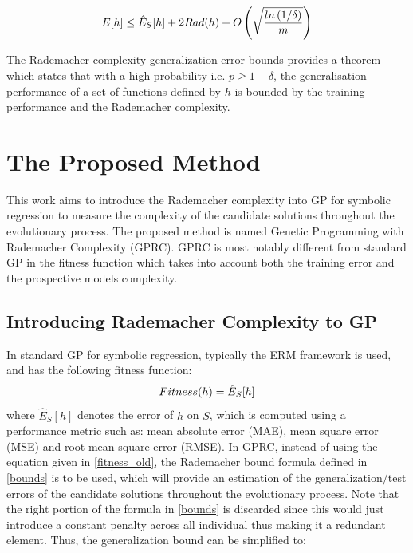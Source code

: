 \documentclass[conference]{IEEEtran}
\begin{document}
\begin{equation}\label{bounds}
\footnotesize
 E[h]\leq\hat{E}_{S}[h] + 2Rad(h) + O\left(\sqrt{\frac{ln\left(1/\delta\right)}{m}}\right)
\end{equation}

The Rademacher complexity generalization error bounds provides a theorem which states that with a high probability i.e. $p \geq 1 - \delta$, the generalisation performance of a set of functions defined by $h$ is bounded by the training performance and the Rademacher complexity.



\section{The Proposed Method}
\label{se:method}
This work aims to introduce the Rademacher complexity into GP for symbolic regression to measure the complexity of the candidate solutions throughout the evolutionary process. The proposed method is named Genetic Programming with Rademacher Complexity (GPRC). GPRC is most notably different from standard GP in the fitness function which takes into account both the training error and the prospective models complexity.

\subsection{Introducing Rademacher Complexity to GP}

In standard GP for symbolic regression, typically the ERM framework is used, and has the following fitness function:
\begin{equation}\label{fitness_old}
\footnotesize
Fitness(h) = \hat{E}_{S}[h]
\end{equation}
where $\hat{E}_{S}[h]$ denotes the error of $h$ on $S$, which is computed using a performance metric such as: mean absolute error (MAE), mean square error (MSE) and root mean square error (RMSE). In GPRC, instead of using the equation given in \eqref{fitness_old}, the Rademacher bound formula defined in \eqref{bounds} is to be used, which will provide an estimation of the generalization/test errors of the candidate solutions throughout the evolutionary process. Note that the right portion of the formula in \eqref{bounds} is discarded since this would just introduce a constant penalty across all individual thus making it a redundant element. Thus, the generalization bound can be simplified to:
\end{document}
